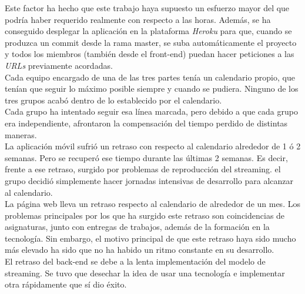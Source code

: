 \documentclass{article}
\begin{document}
Este factor ha hecho que este trabajo haya supuesto un esfuerzo mayor del que podría haber requerido realmente con respecto a las horas.
Además, se ha conseguido desplegar la aplicación en la plataforma \textit{Heroku} para que, cuando se produzca un commit desde la rama master, se suba automáticamente el proyecto y todos los miembros (también desde el front-end) puedan hacer peticiones a las \textit{URLs} previamente acordadas.\\
\hfill \break
Cada equipo encargado de una de las tres partes tenía un calendario propio, que tenían que seguir lo máximo posible siempre y cuando se pudiera.  
Ninguno de los tres grupos acabó dentro de lo establecido por el calendario.\\
\hfill \break
Cada grupo ha intentado seguir esa línea marcada, pero debido a que cada grupo era independiente, afrontaron la compensación del tiempo perdido de distintas maneras.\\
La aplicación móvil sufrió un retraso con respecto al calendario alrededor de 1 ó 2 semanas. Pero se recuperó ese tiempo durante las últimas 2 semanas. Es decir, frente a ese retraso, surgido por problemas de reproducción del streaming. el grupo decidió simplemente hacer jornadas intensivas de desarrollo para alcanzar al calendario.\\
\hfill \break
La página web lleva un retraso respecto al calendario de alrededor de un mes. Los problemas principales por los que ha surgido este retraso son coincidencias de asignaturas, junto con entregas de trabajos, además de la formación en la tecnología. Sin embargo, el motivo principal de que este retraso haya sido mucho más elevado ha sido que no ha habido un ritmo constante en su desarrollo.\\
\hfill \break
El retraso del back-end se debe a la lenta implementación del modelo de streaming. Se tuvo que desechar la idea de usar una tecnología e implementar otra rápidamente que sí dio éxito.
\end{document}
